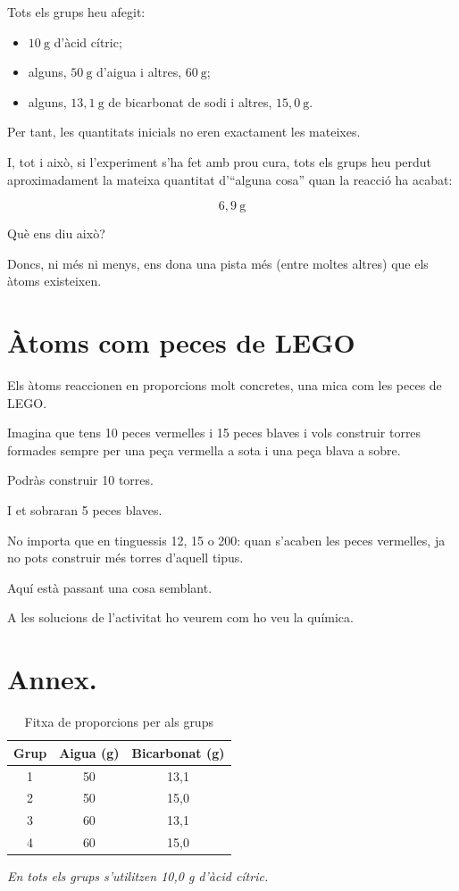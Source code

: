 Tots els grups heu afegit:

\begin{itemize}
    \item \(10\ \text{g}\) d'àcid cítric;
    \item alguns, \(50\ \text{g}\) d'aigua i altres, \(60\ \text{g}\);
    \item alguns, \(13,1\ \text{g}\) de bicarbonat de sodi i altres, \(15,0\ \text{g}\).
\end{itemize}

Per tant, les quantitats inicials no eren exactament les mateixes.

I, tot i això, si l'experiment s'ha fet amb prou cura, tots els grups heu perdut aproximadament la mateixa quantitat d'``alguna cosa'' quan la reacció ha acabat:

\[
6,9\ \text{g}
\]

Què ens diu això?

Doncs, ni més ni menys, ens dona una pista més (entre moltes altres) que els àtoms existeixen.

\section{Àtoms com peces de LEGO}

Els àtoms reaccionen en proporcions molt concretes, una mica com les peces de LEGO.

Imagina que tens 10 peces vermelles i 15 peces blaves i vols construir torres formades sempre per una peça vermella a sota i una peça blava a sobre.

Podràs construir 10 torres.

I et sobraran 5 peces blaves.

No importa que en tinguessis 12, 15 o 200: quan s'acaben les peces vermelles, ja no pots construir més torres d'aquell tipus.

Aquí està passant una cosa semblant.

A les solucions de l’activitat ho veurem com ho veu la química.

\section{Annex.}

\begin{table}[h]
\centering
\caption{Fitxa de proporcions per als grups}
\small
\begin{tabular}{c|cc}
\hline
\textbf{Grup} & \textbf{Aigua (g)} & \textbf{Bicarbonat (g)} \\
\hline
1 & 50 & 13,1 \\
2 & 50 & 15,0 \\
3 & 60 & 13,1 \\
4 & 60 & 15,0 \\
\hline
\end{tabular}

\vspace{0.3em}
\footnotesize
\textit{En tots els grups s'utilitzen 10,0 g d'àcid cítric.}
\end{table}